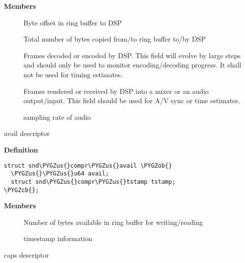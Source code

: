 \documentclass[a4paper,8pt,english]{sphinxmanual}
\def\PYGZus{\char`\_}
\def\PYGZob{\char`\{}
\def\PYGZcb{\char`\}}
\begin{document}
\textbf{Members}
\begin{description}
\item[{}] \leavevmode
Byte offset in ring buffer to DSP

\item[{}] \leavevmode
Total number of bytes copied from/to ring buffer to/by DSP

\item[{}] \leavevmode
Frames decoded or encoded by DSP. This field will evolve by
large steps and should only be used to monitor encoding/decoding
progress. It shall not be used for timing estimates.

\item[{}] \leavevmode
Frames rendered or received by DSP into a mixer or an audio
output/input. This field should be used for A/V sync or time estimates.

\item[{}] \leavevmode
sampling rate of audio

\end{description}

\begin{fulllineitems}
\label{sound/kernel-api/alsa-driver-api:c.snd_compr_avail}
avail descriptor

\end{fulllineitems}


\textbf{Definition}

\begin{Verbatim}[commandchars=\\\{\}]
struct snd\PYGZus{}compr\PYGZus{}avail \PYGZob{}
  \PYGZus{}\PYGZus{}u64 avail;
  struct snd\PYGZus{}compr\PYGZus{}tstamp tstamp;
\PYGZcb{};
\end{Verbatim}

\textbf{Members}
\begin{description}
\item[{}] \leavevmode
Number of bytes available in ring buffer for writing/reading

\item[{}] \leavevmode
timestamp information

\end{description}

\begin{fulllineitems}
\label{sound/kernel-api/alsa-driver-api:c.snd_compr_caps}
caps descriptor

\end{fulllineitems}
\end{document}
